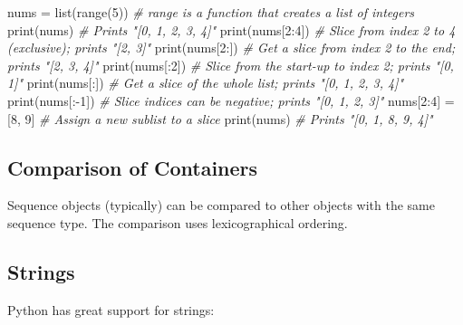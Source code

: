\documentclass[
]{article}
\newenvironment{Shaded}{}{}
\newcommand{\BuiltInTok}[1]{#1}
\newcommand{\CommentTok}[1]{\textcolor[rgb]{0.38,0.63,0.69}{\textit{#1}}}
\newcommand{\DecValTok}[1]{\textcolor[rgb]{0.25,0.63,0.44}{#1}}
\newcommand{\NormalTok}[1]{#1}
\newcommand{\OperatorTok}[1]{\textcolor[rgb]{0.40,0.40,0.40}{#1}}
\begin{document}
\begin{Shaded}
\begin{Highlighting}[]
\NormalTok{nums }\OperatorTok{=} \BuiltInTok{list}\NormalTok{(}\BuiltInTok{range}\NormalTok{(}\DecValTok{5}\NormalTok{)) }\CommentTok{\# range is a function that creates a list of integers}
\BuiltInTok{print}\NormalTok{(nums)           }\CommentTok{\# Prints "[0, 1, 2, 3, 4]"}
\BuiltInTok{print}\NormalTok{(nums[}\DecValTok{2}\NormalTok{:}\DecValTok{4}\NormalTok{])      }\CommentTok{\# Slice from index 2 to 4 (exclusive); prints "[2, 3]"}
\BuiltInTok{print}\NormalTok{(nums[}\DecValTok{2}\NormalTok{:])       }\CommentTok{\# Get a slice from index 2 to the end; prints "[2, 3, 4]"}
\BuiltInTok{print}\NormalTok{(nums[:}\DecValTok{2}\NormalTok{])       }\CommentTok{\# Slice from the start{-}up to index 2; prints "[0, 1]"}
\BuiltInTok{print}\NormalTok{(nums[:])        }\CommentTok{\# Get a slice of the whole list; prints "[0, 1, 2, 3, 4]"}
\BuiltInTok{print}\NormalTok{(nums[:}\OperatorTok{{-}}\DecValTok{1}\NormalTok{])      }\CommentTok{\# Slice indices can be negative; prints "[0, 1, 2, 3]"}
\NormalTok{nums[}\DecValTok{2}\NormalTok{:}\DecValTok{4}\NormalTok{] }\OperatorTok{=}\NormalTok{ [}\DecValTok{8}\NormalTok{, }\DecValTok{9}\NormalTok{]    }\CommentTok{\# Assign a new sublist to a slice}
\BuiltInTok{print}\NormalTok{(nums)           }\CommentTok{\# Prints "[0, 1, 8, 9, 4]"}
\end{Highlighting}
\end{Shaded}

\hypertarget{comparison-of-containers}{%
\subsection{\texorpdfstring{Comparison of Containers
}{Comparison of Containers }}\label{comparison-of-containers}}

Sequence objects (typically) can be compared to other objects with the
same sequence type. The comparison uses lexicographical ordering.

\hypertarget{strings}{%
\subsection{Strings}\label{strings}}

Python has great support for strings:
\end{document}
